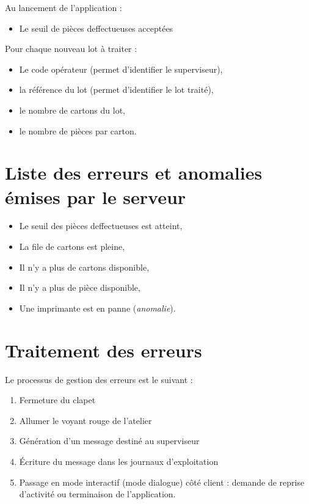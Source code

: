 Au lancement de l'application :
\begin{itemize}
	\item Le seuil de pièces deffectueuses acceptées
\end{itemize}
Pour chaque nouveau lot à traiter :
\begin{itemize}
	\item Le code opérateur (permet d'identifier le superviseur),
	\item la référence du lot (permet d'identifier le lot traité),
	\item le nombre de cartons du lot,
	\item le nombre de pièces par carton.
\end{itemize}

\section{Liste des erreurs et anomalies émises par le serveur}

\begin{itemize}
	\item Le seuil des pièces deffectueuses est atteint,
	\item La file de cartons est pleine,
	\item Il n'y a plus de cartons disponible,
	\item Il n'y a plus de pièce disponible,
	\item Une imprimante est en panne (\textit{anomalie}).
\end{itemize}

\section{Traitement des erreurs}

Le processus de gestion des erreurs est le suivant :

\begin{enumerate}
	\item Fermeture du clapet
	\item Allumer le voyant rouge de l'atelier
	\item Génération d'un message destiné au superviseur
	\item Écriture du message dans les journaux d'exploitation
	\item Passage en mode interactif (mode dialogue) côté client : demande de
reprise d'activité ou terminaison de l'application. 
\end{enumerate}

